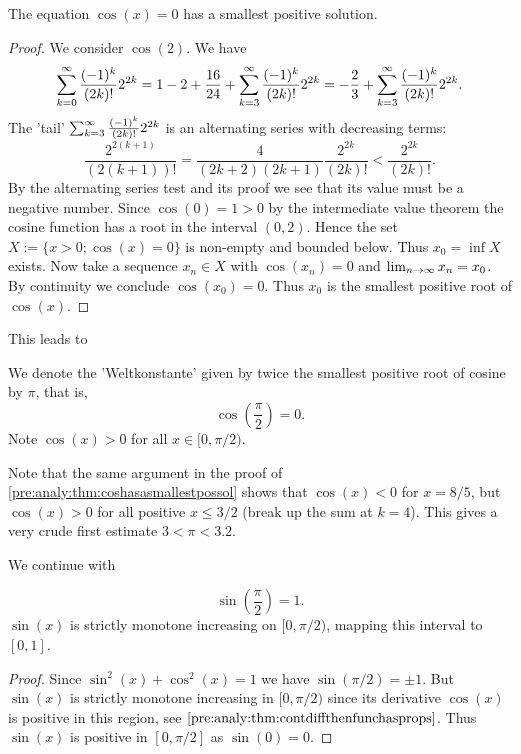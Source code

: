 \documentclass[10pt, a4paper]{article}
\begin{document}
\begin{theorem}\label{pre:analy:thm:coshasasmallestpossol}
    The equation $\cos(x) = 0$ has a smallest positive solution.
    \begin{proof}
        We consider $\cos(2)$.
        We have
        \[
        \infsumo\frac{(-1) ^ k}{(2k)!}2 ^ {2k} = 1 - 2 + \frac{16}{24} + \infsum[k = 3]\frac{(-1) ^ k}{(2k)!}2 ^ {2k} = -\frac{2}{3} + \infsum[k = 3]\frac{(-1) ^ k}{(2k)!}2 ^ {2k}.
        \]
        The 'tail' $\infsum[k = 3]\frac{(-1) ^ k}{(2k)!}2 ^ {2k}$ is an alternating series with decreasing terms:
        \[
        \frac{2 ^ {2(k + 1)}}{(2(k + 1))!} = \frac{4}{(2k + 2)(2k + 1)}\frac{2 ^ {2k}}{(2k)!} < \frac{2 ^ {2k}}{(2k)!}.
        \]
        By the alternating series test and its proof we see that its value must be a negative number.
        Since $\cos(0) = 1 > 0$ by the intermediate value theorem the cosine function has a root in the interval $(0, 2)$.
        Hence the set $X := \{x > 0; \cos(x) = 0\}$ is non-empty and bounded below.
        Thus $x_0 = \inf{X}$ exists.
        Now take a sequence $x_n \in X$ with $\cos(x_n) = 0$ and $\liminfty x_n = x_0$.
        By continuity we conclude $\cos(x_0) = 0$.
        Thus $x_0$ is the smallest positive root of $\cos(x)$.
    \end{proof}
\end{theorem}

This leads to
\begin{definition}
    We denote the 'Weltkonstante' given by twice the smallest positive root of cosine by $\pi$,
    that is,
    \[
    \cos\left(\frac{\pi}{2}\right) = 0.
    \]
    Note $\cos(x) > 0$ for all $x \in [0, \pi / 2)$.
\end{definition}

Note that the same argument in the proof of \autoref{pre:analy:thm:coshasasmallestpossol} shows that $\cos(x) < 0$ for $x = 8 / 5$,
but $\cos(x) > 0$ for all positive $x \leq 3 / 2$
(break up the sum at $k = 4$).
This gives a very crude first estimate $3 < \pi < 3.2$.

We continue with
\begin{theorem}
    \[
    \sin\left(\frac{\pi}{2}\right) = 1.
    \]
    $\sin(x)$ is strictly monotone increasing on $[0, \pi / 2)$,
    mapping this interval to $[0, 1]$.
    \begin{proof}
        Since $\sin ^ 2(x) + \cos ^ 2(x) = 1$ we have $\sin(\pi / 2) = \pm 1$.
        But $\sin(x)$ is strictly monotone increasing in $[0, \pi / 2)$ since its derivative $\cos(x)$ is positive in this region,
        see $\autoref{pre:analy:thm:contdiffthenfunchasprops}$.
        Thus $\sin(x)$ is positive in $[0, \pi / 2]$ as $\sin(0) = 0$.
    \end{proof}
\end{theorem}
\end{document}
